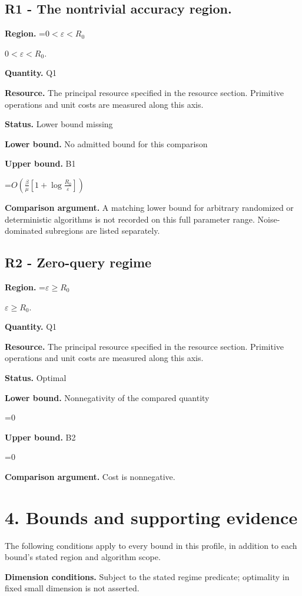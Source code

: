 \documentclass[10pt,a4paper]{article}
\newcommand{\AtlasMath}[1]{\par\begingroup\centering\setbox0=\hbox{$\displaystyle #1$}\ifdim\wd0>1.4\linewidth\typeout{ATLAS WIDE FORMULA: \the\wd0}\fi\ifdim\wd0>\linewidth\resizebox{\linewidth}{!}{\box0}\else\box0\fi\par\endgroup}
\newcommand{\AtlasInlineMath}[1]{\begingroup\setbox0=\hbox{$#1$}\ifdim\wd0>.4\linewidth\endgroup\AtlasMath{#1}\else\endgroup$#1$\fi}
\begin{document}
\subsection{R1 - The nontrivial accuracy region.}
\textbf{Region.} \AtlasInlineMath{0<\varepsilon<R_0}.

\textbf{Quantity.} Q1

\textbf{Resource.} The principal resource specified in the resource section. Primitive operations and unit costs are measured along this axis.

\textbf{Status.} Lower bound missing

\textbf{Lower bound.} No admitted bound for this comparison

\textbf{Upper bound.} B1

\AtlasMath{O\!\left(\frac{\beta}{\mu}\left[1+\log\frac{R_0}{\varepsilon}\right]\right)}
\textbf{Comparison argument.} A matching lower bound for arbitrary randomized or deterministic algorithms is not recorded on this full parameter range. Noise-dominated subregions are listed separately.

\subsection{R2 - Zero-query regime}
\textbf{Region.} \AtlasInlineMath{\varepsilon\ge R_0}.

\textbf{Quantity.} Q1

\textbf{Resource.} The principal resource specified in the resource section. Primitive operations and unit costs are measured along this axis.

\textbf{Status.} Optimal

\textbf{Lower bound.} Nonnegativity of the compared quantity

\AtlasMath{0}
\textbf{Upper bound.} B2

\AtlasMath{0}
\textbf{Comparison argument.} Cost is nonnegative.

\section{4. Bounds and supporting evidence}
The following conditions apply to every bound in this profile, in addition to each bound's stated region and algorithm scope.

\textbf{Dimension conditions.} Subject to the stated regime predicate; optimality in fixed small dimension is not asserted.
\end{document}
